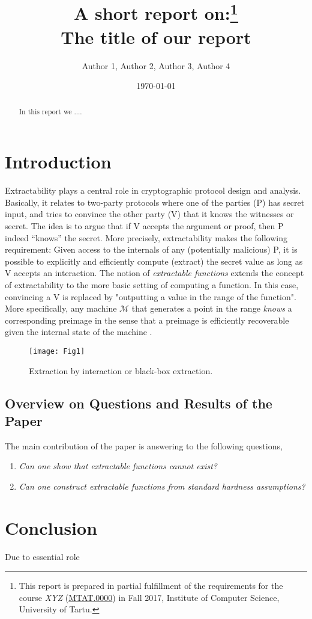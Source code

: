 \documentclass[letterpaper,12pt]{article}
\title{\vspace{-1.80cm} \small{A short report on:\footnote{This report is prepared in partial fulfillment of the requirements for the course \textit{XYZ} (\href{https://courses.cs.ut.ee}{MTAT.0000}) in Fall 2017, Institute of Computer Science, University of Tartu.}} \\ \vspace{2 mm} \large {\textbf{The title of our report}}}
\author{Author 1, Author 2, Author 3, Author 4}
\affil{\vspace{-0.4cm} University of Tartu, Estonia \\ \href{mailto:xyz@ut.ee}{zyz@ut.ee}}
\date{\vspace{-0.9cm} \scriptsize{\today}}
\begin{document}
\maketitle 
\vspace*{-6 mm}
\begin{abstract}
In this report we ....	

\end{abstract}


\section{Introduction} \label{Intro}


Extractability plays a central role in cryptographic protocol design and analysis. Basically, it relates  to  two-party  protocols  where  one  of  the  parties  (P) has secret input, and tries to convince the other party (V) that it knows the witnesses or secret. The idea is to argue that if V accepts the argument or proof, then P indeed “knows” the secret. More precisely, extractability makes the following requirement: Given access to the internals of any (potentially malicious) P, it is possible to explicitly and efficiently compute (extract) the secret value as long as V accepts an interaction. The notion of \textit{extractable functions} extends the concept of extractability to the more basic setting of computing a function. In this case, convincing a V is replaced by "outputting a value in the range of the function". More specifically, any machine $\mathcal{M}$ that generates a point in the range \textit{knows} a corresponding preimage in the sense that a preimage is efficiently recoverable given the internal state of the machine  \cite{Canetti09-extractable}. 

\begin{figure}[h!]
	\centering
	\texttt{[image: Fig1]}
	\caption{Extraction by interaction or black-box extraction.}
	\label{fig00}
\end{figure}
%




\subsection{Overview on Questions and Results of the Paper}

The main contribution of the paper is answering to the following questions, 
\begin{enumerate}
	\item \textit{Can one show that extractable functions cannot exist?}
	\item \textit{Can one construct extractable functions from standard hardness assumptions?}
\end{enumerate}


\section{Conclusion}
Due to essential role 





%
%
 
\end{document}
